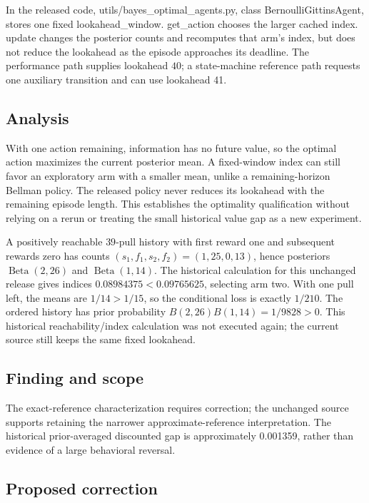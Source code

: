 \documentclass[11pt]{article}
\begin{document}
In the released code, utils/bayes\_optimal\_agents.py, class BernoulliGittinsAgent, stores one fixed lookahead\_window. get\_action chooses the larger cached index. update changes the posterior counts and recomputes that arm’s index, but does not reduce the lookahead as the episode approaches its deadline. The performance path supplies lookahead \(40\); a state-machine reference path requests one auxiliary transition and can use lookahead 41.

\subsection*{Analysis}

With one action remaining, information has no future value, so the optimal action maximizes the current posterior mean. A fixed-window index can still favor an exploratory arm with a smaller mean, unlike a remaining-horizon Bellman policy. The released policy never reduces its lookahead with the remaining episode length. This establishes the optimality qualification without relying on a rerun or treating the small historical value gap as a new experiment.

A positively reachable \(39\)-pull history with first reward one and subsequent rewards zero has counts \((s_1,f_1,s_2,f_2)=(1,25,0,13)\), hence posteriors \(\operatorname{Beta}(2,26)\) and \(\operatorname{Beta}(1,14)\). The historical calculation for this unchanged release gives indices \(0.08984375<0.09765625\), selecting arm two. With one pull left, the means are \(1/14>1/15\), so the conditional loss is exactly \(1/210\). The ordered history has prior probability \(B(2,26)B(1,14)=1/9828>0\). This historical reachability/index calculation was not executed again; the current source still keeps the same fixed lookahead.

\subsection*{Finding and scope}

The exact-reference characterization requires correction; the unchanged source supports retaining the narrower approximate-reference interpretation. The historical prior-averaged discounted gap is approximately 0.001359, rather than evidence of a large behavioral reversal.

\subsection*{Proposed correction}
\end{document}
